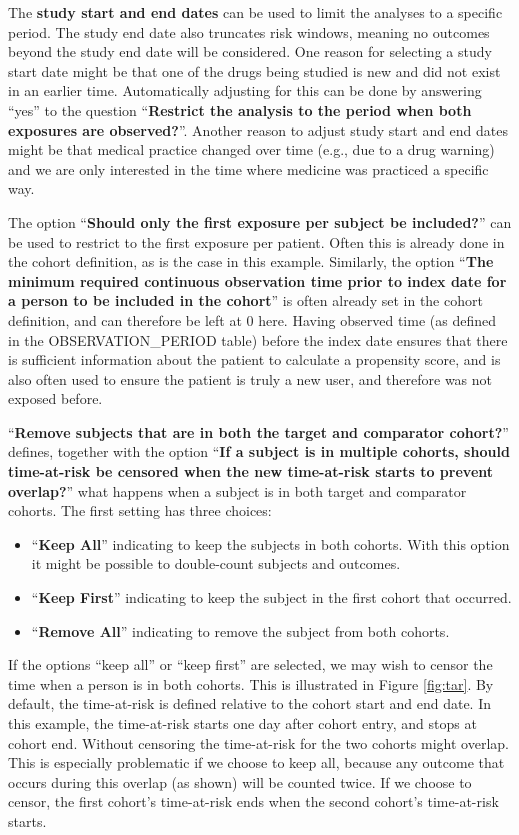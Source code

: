 \documentclass[11pt]{book}
\providecommand{\tightlist}{%
  \setlength{\itemsep}{0pt}\setlength{\parskip}{0pt}}
\theoremstyle{definition}
\theoremstyle{definition}
\theoremstyle{definition}
\theoremstyle{remark}
\begin{document}
The \textbf{study start and end dates} can be used to limit the analyses to a specific period. The study end date also truncates risk windows, meaning no outcomes beyond the study end date will be considered. One reason for selecting a study start date might be that one of the drugs being studied is new and did not exist in an earlier time. Automatically adjusting for this can be done by answering ``yes'' to the question ``\textbf{Restrict the analysis to the period when both exposures are observed?}''. Another reason to adjust study start and end dates might be that medical practice changed over time (e.g., due to a drug warning) and we are only interested in the time where medicine was practiced a specific way.

The option ``\textbf{Should only the first exposure per subject be included?}'' can be used to restrict to the first exposure per patient. Often this is already done in the cohort definition, as is the case in this example. Similarly, the option ``\textbf{The minimum required continuous observation time prior to index date for a person to be included in the cohort}'' is often already set in the cohort definition, and can therefore be left at 0 here. Having observed time (as defined in the OBSERVATION\_PERIOD table) before the index date ensures that there is sufficient information about the patient to calculate a propensity score, and is also often used to ensure the patient is truly a new user, and therefore was not exposed before.

``\textbf{Remove subjects that are in both the target and comparator cohort?}'' defines, together with the option ``\textbf{If a subject is in multiple cohorts, should time-at-risk be censored when the new time-at-risk starts to prevent overlap?}'' what happens when a subject is in both target and comparator cohorts. The first setting has three choices:

\begin{itemize}
\tightlist
\item
  ``\textbf{Keep All}'' indicating to keep the subjects in both cohorts. With this option it might be possible to double-count subjects and outcomes.
\item
  ``\textbf{Keep First}'' indicating to keep the subject in the first cohort that occurred.
\item
  ``\textbf{Remove All}'' indicating to remove the subject from both cohorts.
\end{itemize}

If the options ``keep all'' or ``keep first'' are selected, we may wish to censor the time when a person is in both cohorts. This is illustrated in Figure \ref{fig:tar}. By default, the time-at-risk is defined relative to the cohort start and end date. In this example, the time-at-risk starts one day after cohort entry, and stops at cohort end. Without censoring the time-at-risk for the two cohorts might overlap. This is especially problematic if we choose to keep all, because any outcome that occurs during this overlap (as shown) will be counted twice. If we choose to censor, the first cohort's time-at-risk ends when the second cohort's time-at-risk starts.
\end{document}
